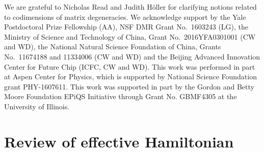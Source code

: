 \documentclass[aps, prb, showpacs, twocolumn, notitlepage, superscriptaddress]{revtex4-1}
\begin{document}


\begin{acknowledgments}

We are grateful to Nicholas Read and Judith H\"oller for clarifying notions related to codimensions of matrix degeneracies. 
We acknowledge support by  the Yale Postdoctoral Prize Fellowship (AA), NSF DMR Grant No.\ 1603243 (LG),  the Ministry of Science and Technology of China, Grant No.\ 2016YFA0301001 (CW and WD), the National Natural Science Foundation of China, Grants No.\ 11674188 and 11334006 (CW and WD) and the Beijing Advanced Innovation Center for Future Chip (ICFC, CW and WD). This work was performed in part at Aspen Center for Physics, which is supported by National Science Foundation grant PHY-1607611. This work was supported in part by the Gordon and Betty Moore Foundation EPiQS Initiative through Grant No. GBMF4305 at the University of Illinois.
\end{acknowledgments}




\appendix

\section{Review of effective Hamiltonian}\label{app:revieweffham}
\end{document}
